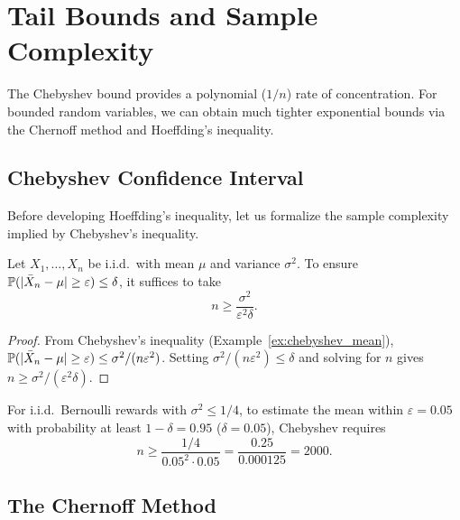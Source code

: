 \documentclass[11pt,a4paper]{article}
\begin{document}

\section{Tail Bounds and Sample Complexity}
\label{sec:tail_bounds}

The Chebyshev bound provides a polynomial ($1/n$) rate of
concentration. For bounded random variables, we can obtain much
tighter exponential bounds via the Chernoff method and Hoeffding's
inequality.

\subsection{Chebyshev Confidence Interval}

Before developing Hoeffding's inequality, let us formalize the sample
complexity implied by Chebyshev's inequality.

\begin{proposition}
\label{prop:chebyshev_sample}
Let $X_1, \ldots, X_n$ be i.i.d.\ with mean $\mu$ and variance
$\sigma^2$. To ensure
$\mathbb{P}(|\bar{X}_n - \mu| \geq \varepsilon) \leq \delta$,
it suffices to take
\[
    n \geq \frac{\sigma^2}{\varepsilon^2 \delta}.
\]
\end{proposition}

\begin{proof}
From Chebyshev's inequality
(Example~\ref{ex:chebyshev_mean}),
$\mathbb{P}(|\bar{X}_n - \mu| \geq \varepsilon) \leq \sigma^2/(n\varepsilon^2)$.
Setting $\sigma^2/(n\varepsilon^2) \leq \delta$ and solving for $n$
gives $n \geq \sigma^2/(\varepsilon^2 \delta)$.
\end{proof}

\begin{example}
\label{ex:chebyshev_sample}
For i.i.d.\ Bernoulli rewards with $\sigma^2 \leq 1/4$, to estimate
the mean within $\varepsilon = 0.05$ with probability at least
$1 - \delta = 0.95$ ($\delta = 0.05$), Chebyshev requires
\[
    n \geq \frac{1/4}{0.05^2 \cdot 0.05} = \frac{0.25}{0.000125} = 2000.
\]
\end{example}

\subsection{The Chernoff Method}
\end{document}
